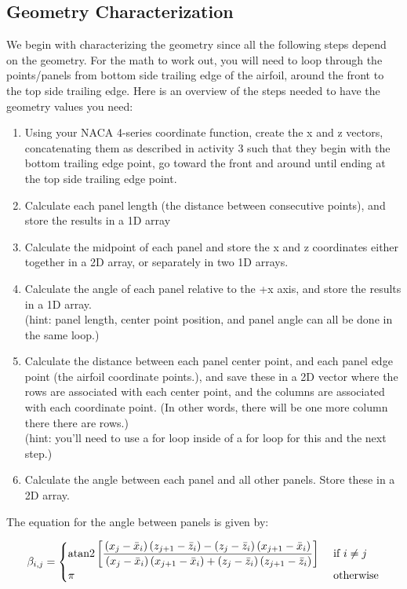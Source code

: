 \documentclass{article}%
\begin{document}
\subsection*{Geometry Characterization}
We begin with characterizing the geometry since all the following steps depend on the geometry. For the math to work out, you will need to loop through the points/panels from bottom side trailing edge of the airfoil, around the front to the top side trailing edge. Here is an overview of the steps needed to have the geometry values you need:
\begin{enumerate}
	\item Using your NACA 4-series coordinate function, create the x and z vectors, concatenating them as described in activity 3 such that they begin with the bottom trailing edge point, go toward the front and around until ending at the top side trailing edge point.
	\item Calculate each panel length (the distance between consecutive points), and store the results in a 1D array
	\item Calculate the midpoint of each panel and store the x and z coordinates either together in a 2D array, or separately in two 1D arrays.
	\item Calculate the angle of each panel relative to the +x axis, and store the results in a 1D array.
	\\(hint: panel length, center point position, and panel angle can all be done in the same loop.)
	\item Calculate the distance between each panel center point, and each panel edge point (the airfoil coordinate points.), and save these in a 2D vector where the rows are associated with each center point, and the columns are associated with each coordinate point. (In other words, there will be one more column there there are rows.)
	\\(hint: you'll need to use a for loop inside of a for loop for this and the next step.)
	\item Calculate the angle between each panel and all other panels. Store these in a 2D array.
\end{enumerate}

The equation for the angle between panels is given by:

\begin{equation}
	\beta_{i,j} = 
	\begin{cases}
		\text{atan2}\left[ \qfrac{ \left( x_j-\bar{x}_i \right) \left( z_{j+1} - \bar{z}_i \right) - \left( z_j-\bar{z}_i \right) \left( x_{j+1} - \bar{x}_i \right) }{ \left( x_j-\bar{x}_i \right) \left( x_{j+1} - \bar{x}_i \right) + \left( z_j-\bar{z}_i \right) \left( z_{j+1} - \bar{z}_i \right) } \right] &\text{  if } i \neq j\\
		\pi &\text{  otherwise}
	\end{cases}
\end{equation}
\end{document}
